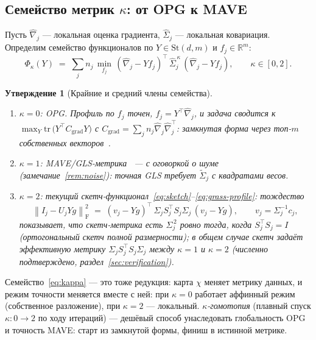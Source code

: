 \documentclass[11pt,a4paper]{article}
\newcommand{\R}{\mathbb{R}}
\newcommand{\Id}{I}
\newcommand{\T}{^{\!\top}}
\newcommand{\F}{\mathrm{F}}
\newcommand{\St}{\mathrm{St}}
\newcommand{\tr}{\mathrm{tr}\,}
\newcommand{\erm}[1]{\left\|#1\right\|_{\F}}
\theoremstyle{plain}
\newtheorem{prop}[theorem]{Утверждение}
\theoremstyle{definition}
\theoremstyle{remark}
\begin{document}
\subsection{Семейство метрик $\kappa$: от OPG к MAVE}

Пусть $\hat\nabla_j$ --- локальная оценка градиента, $\hat\Sigma_j$ --- локальная
ковариация. Определим семейство функционалов по $Y\in\St(d,m)$ и
$f_j\in\R^m$:
\begin{equation}\label{eq:kappa}
\Phi_\kappa(Y)\;=\;\sum_j n_j\,\min_{f_j}\,
(\hat\nabla_j-Yf_j)\T\,\hat\Sigma_j^{\,\kappa}\,(\hat\nabla_j-Yf_j),
\qquad \kappa\in[0,2].
\end{equation}

\begin{prop}[Крайние и средний члены семейства]\label{prop:kappa}
\begin{enumerate}[label=(\roman*),leftmargin=2.2em]
\item $\kappa=0$: OPG. Профиль по $f_j$ точен, $f_j=Y\T\hat\nabla_j$, и
задача сводится к $\max_Y\tr\bigl(Y\T C_{\mathrm{grad}}Y\bigr)$ с
$C_{\mathrm{grad}}=\sum_j n_j\hat\nabla_j\hat\nabla_j\T$: замкнутая форма через
топ-$m$ собственных векторов~\cite{hjps-2001}.
\item $\kappa=1$: MAVE/GLS-метрика~\cite{xia-2002-mave} --- с оговоркой о
шуме (замечание~\ref{rem:noise}): точная GLS требует $\widetilde\Sigma_j$
с квадратами весов.
\item $\kappa=2$: текущий скетч-функционал~\eqref{eq:sketch}--\eqref{eq:grass-profile}:
тождество
\begin{equation}\label{eq:sketch-identity}
\erm{I_j-U_jYg}^2\;=\;(v_j-Yg)\T\,\Sigma_j S_j\T S_j\Sigma_j\,(v_j-Yg),
\qquad v_j=\Sigma_j^{-1}c_j,
\end{equation}
показывает, что скетч-метрика есть $\Sigma_j^{\,2}$ ровно тогда, когда
$S_j\T S_j=\Id$ (ортогональный скетч полной размерности); в общем случае
скетч задаёт \emph{эффективную} метрику $\Sigma_j S_j\T S_j\Sigma_j$ между
$\kappa=1$ и $\kappa=2$ (численно подтверждено, раздел~\ref{sec:verification}).
\end{enumerate}
\end{prop}

Семейство~\eqref{eq:kappa} --- это тоже редукция: карта $\chi$ меняет
метрику данных, и режим точности меняется вместе с ней: при $\kappa=0$
работает аффинный режим (собственное разложение), при $\kappa=2$ ---
локальный. \emph{$\kappa$-гомотопия} (плавный спуск $\kappa:0\to2$ по ходу
итераций) --- дешёвый способ унаследовать глобальность OPG и точность
MAVE: старт из замкнутой формы, финиш в истинной метрике.
\end{document}
